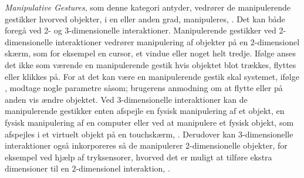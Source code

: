 %
\textit{Manipulative Gestures}, som denne kategori antyder, vedrører de manipulerende gestikker hvorved objekter, i en eller anden grad, manipuleres, \parencite[s. 5]{PDF:ATaxonomyOfGestures}. Det kan både foregå ved 2- og 3-dimensionelle interaktioner. Manipulerende gestikker ved 2-dimensionelle interaktioner vedrører manipulering af objekter på en 2-dimensionel skærm, som for eksempel en cursor, et vindue eller noget helt tredje. Ifølge \textcite[s. 5]{PDF:ATaxonomyOfGestures} anses det ikke som værende en manipulerende gestik hvis objektet blot trækkes, flyttes eller klikkes på. For at det kan være en manipulerende gestik skal systemet, ifølge \textcite[s. 5]{PDF:ATaxonomyOfGestures}, modtage nogle parametre såsom; brugerens anmodning om at flytte eller på anden vis ændre objektet. Ved 3-dimensionelle interaktioner kan de manipulerende gestikker enten afspejle en fysisk manipulering af et objekt, en fysisk manipulering af en computer eller ved at manipulere et fysisk objekt, som afspejles i et virtuelt objekt på en touchskærm, \parencite[s. 6]{PDF:ATaxonomyOfGestures}. Derudover kan 3-dimensionelle interaktioner også inkorporeres så de manipulerer 2-dimensionelle objekter, for eksempel ved hjælp af tryksensorer, hvorved det er muligt at tilføre ekstra dimensioner til en 2-dimensionel interaktion, \parencite[s. 5]{PDF:ATaxonomyOfGestures}. 

